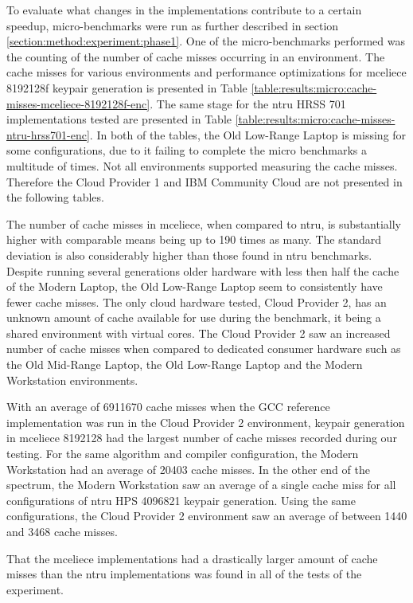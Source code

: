 
To evaluate what changes in the implementations contribute to a certain speedup, micro-benchmarks were run as further described in section \ref{section:method:experiment:phase1}. One of the micro-benchmarks performed was the counting of the number of cache misses occurring in an environment. The cache misses for various environments and performance optimizations for \gls{mceliece} 8192128f keypair generation is presented in Table \ref{table:results:micro:cache-misses-mceliece-8192128f-enc}. The same stage for the \gls{ntru} HRSS 701 implementations tested are presented in Table \ref{table:results:micro:cache-misses-ntru-hrss701-enc}. In both of the tables, the Old Low-Range Laptop is missing for some configurations, due to it failing to complete the micro benchmarks a multitude of times. Not all environments supported measuring the cache misses. Therefore the Cloud Provider 1 and IBM Community Cloud are not presented in the following tables.

The number of cache misses in \gls{mceliece}, when compared to \gls{ntru}, is substantially higher with comparable means being up to 190 times as many. The standard deviation is also considerably higher than those found in \gls{ntru} benchmarks. Despite running several generations older hardware with less then half the cache of the Modern Laptop, the Old Low-Range Laptop seem to consistently have fewer cache misses. The only cloud hardware tested, Cloud Provider 2, has an unknown amount of cache available for use during the benchmark, it being a shared environment with virtual cores. The Cloud Provider 2 saw an increased number of cache misses when compared to dedicated consumer hardware such as the Old Mid-Range Laptop, the Old Low-Range Laptop and the Modern Workstation environments.



With an average of 6911670 cache misses when the GCC reference implementation was run in the Cloud Provider 2 environment, keypair generation in \gls{mceliece} 8192128 had the largest number of cache misses recorded during our testing. For the same algorithm and compiler configuration, the Modern Workstation had an average of 20403 cache misses. In the other end of the spectrum, the Modern Workstation saw an average of a single cache miss for all configurations of \gls{ntru} HPS 4096821 keypair generation. Using the same configurations, the Cloud Provider 2 environment saw an average of between 1440 and 3468 cache misses.

That the \gls{mceliece} implementations had a drastically larger amount of cache misses than the \gls{ntru} implementations was found in all of the tests of the experiment.




